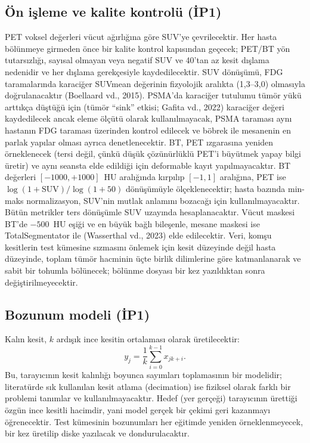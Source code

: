 \documentclass[11pt,a4paper]{article}
\begin{document}
\subsection{Ön işleme ve kalite kontrolü (İP1)}
PET voksel değerleri vücut ağırlığına göre SUV'ye çevrilecektir. Her hasta bölünmeye girmeden
önce bir kalite kontrol kapısından geçecek; PET/BT yön tutarsızlığı, sayısal olmayan veya negatif
SUV ve 40'tan az kesit dışlama nedenidir ve her dışlama gerekçesiyle kaydedilecektir. SUV
dönüşümü, FDG taramalarında karaciğer SUVmean değerinin fizyolojik aralıkta (1,3--3,0) olmasıyla
doğrulanacaktır (Boellaard vd., 2015). PSMA'da karaciğer tutulumu tümör yükü arttıkça düştüğü
için (tümör ``sink'' etkisi; Gafita vd., 2022) karaciğer değeri kaydedilecek ancak eleme ölçütü
olarak kullanılmayacak, PSMA taraması aynı hastanın FDG taraması üzerinden kontrol edilecek ve
böbrek ile mesanenin en parlak yapılar olması ayrıca denetlenecektir. BT, PET ızgarasına yeniden
örneklenecek (tersi değil, çünkü düşük çözünürlüklü PET'i büyütmek yapay bilgi üretir) ve aynı
seansta elde edildiği için deformable kayıt yapılmayacaktır. BT değerleri $[-1000, +1000]$~HU
aralığında kırpılıp $[-1, 1]$ aralığına, PET ise $\log(1 + \mathrm{SUV})/\log(1 + 50)$
dönüşümüyle ölçeklenecektir; hasta bazında min-maks normalizasyon, SUV'nin mutlak anlamını
bozacağı için kullanılmayacaktır. Bütün metrikler ters dönüşümle SUV uzayında hesaplanacaktır.
Vücut maskesi BT'de $-500$~HU eşiği ve en büyük bağlı bileşenle, mesane maskesi ise
TotalSegmentator ile (Wasserthal vd., 2023) elde edilecektir. Veri, komşu kesitlerin test
kümesine sızmasını önlemek için kesit düzeyinde değil hasta düzeyinde, toplam tümör hacminin
üçte birlik dilimlerine göre katmanlanarak ve sabit bir tohumla bölünecek; bölünme dosyası bir
kez yazıldıktan sonra değiştirilmeyecektir.

\subsection{Bozunum modeli (İP1)}
Kalın kesit, $k$ ardışık ince kesitin ortalaması olarak üretilecektir:
\[
  y_j = \frac{1}{k} \sum_{i=0}^{k-1} x_{jk+i}.
\]
Bu, tarayıcının kesit kalınlığı boyunca sayımları toplamasının bir modelidir; literatürde sık
kullanılan kesit atlama (decimation) ise fiziksel olarak farklı bir problemi tanımlar ve
kullanılmayacaktır. Hedef (yer gerçeği) tarayıcının ürettiği özgün ince kesitli hacimdir, yani
model gerçek bir çekimi geri kazanmayı öğrenecektir. Test kümesinin bozunumları her eğitimde
yeniden örneklenmeyecek, bir kez üretilip diske yazılacak ve dondurulacaktır.
\end{document}
